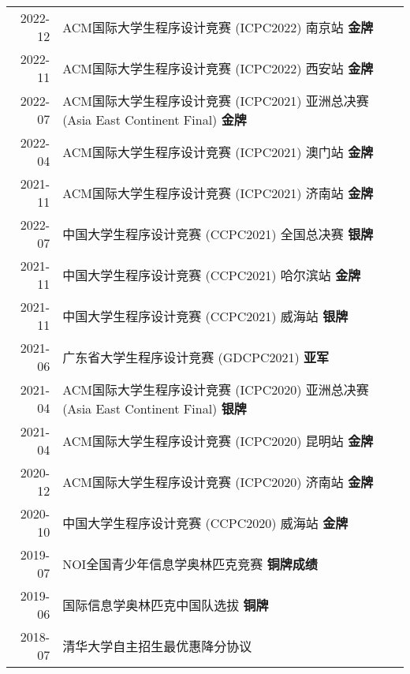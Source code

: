 \begin{tabular}{rl}
	2022-12 & ACM国际大学生程序设计竞赛 (ICPC2022) 南京站 \enspace \textbf{金牌} \\
	2022-11 & ACM国际大学生程序设计竞赛 (ICPC2022) 西安站 \enspace \textbf{金牌} \\
	2022-07 & ACM国际大学生程序设计竞赛 (ICPC2021) 亚洲总决赛 (Asia East Continent Final)  \enspace \textbf{金牌} \\
	2022-04 & ACM国际大学生程序设计竞赛 (ICPC2021) 澳门站 \enspace \textbf{金牌} \\
	2021-11 & ACM国际大学生程序设计竞赛 (ICPC2021) 济南站 \enspace \textbf{金牌} \\
	2022-07 & 中国大学生程序设计竞赛 (CCPC2021) 全国总决赛 \enspace \textbf{银牌} \\
	2021-11 & 中国大学生程序设计竞赛 (CCPC2021) 哈尔滨站 \enspace \textbf{金牌} \\
	2021-11 & 中国大学生程序设计竞赛 (CCPC2021) 威海站 \enspace \textbf{银牌} \\
	2021-06 & 广东省大学生程序设计竞赛 (GDCPC2021) \enspace \textbf{亚军} \\
	2021-04 & ACM国际大学生程序设计竞赛 (ICPC2020) 亚洲总决赛 (Asia East Continent Final)  \enspace \textbf{银牌} \\
	2021-04 & ACM国际大学生程序设计竞赛 (ICPC2020) 昆明站 \enspace \textbf{金牌} \\
	2020-12 & ACM国际大学生程序设计竞赛 (ICPC2020) 济南站 \enspace \textbf{金牌} \\
	2020-10 & 中国大学生程序设计竞赛 (CCPC2020) 威海站 \enspace \textbf{金牌} \\
	2019-07 & NOI全国青少年信息学奥林匹克竞赛 \enspace \textbf{铜牌成绩} \\
	2019-06 & 国际信息学奥林匹克中国队选拔 \enspace \textbf{铜牌} \\
	2018-07 & 清华大学自主招生最优惠降分协议 \\
\end{tabular}

